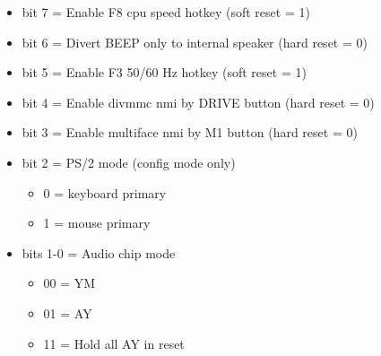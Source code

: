 \begin{itemize}
\item bit 7 = Enable F8 cpu speed hotkey (soft reset = 1)
\item bit 6 = Divert BEEP only to internal speaker (hard reset = 0)
\item bit 5 = Enable F3 50/60 Hz hotkey (soft reset = 1)
\item bit 4 = Enable divmmc nmi by DRIVE button (hard reset = 0)
\item bit 3 = Enable multiface nmi by M1 button (hard reset = 0)
\item bit 2 = PS/2 mode (config mode only)
\begin{itemize}
\item 0 = keyboard primary
\item 1 = mouse primary
\end{itemize}
\item bits 1-0 = Audio chip mode
\begin{itemize}
\item 00 = YM
\item 01 = AY
\item 11 = Hold all AY in reset
\end{itemize}
\end{itemize}

